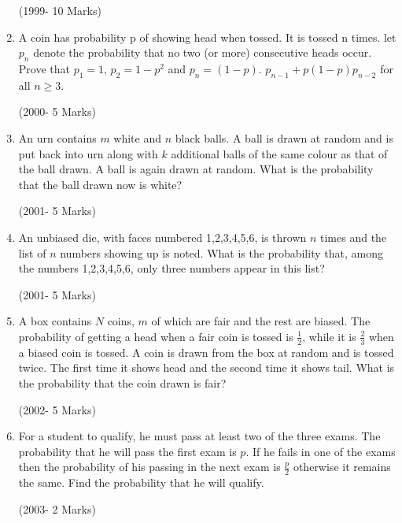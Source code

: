 \documentclass[journal,12pt,onecolumn]{IEEEtran}
\theoremstyle{remark}
\begin{document}
\begin{enumerate}
\hfill(1999- 10 Marks)

\item A coin has probability p of showing head when tossed. It is tossed n times. let $p_{n}$ denote the probability that no two (or more) consecutive heads occur. Prove that $p_{1}=1$, $p_{2}=1-p^2$ and $p_{n}=(1-p)$. $p_{n-1}+p(1-p)p_{n-2}$ for all $n \geq 3$. 

\hfill(2000- 5 Marks)

\item An urn contains $m$ white and $n$ black balls. A ball is drawn at random and is put back into urn along with $k$ additional balls of the same colour as that of the ball drawn. A ball is again drawn at random. What is the probability that the ball drawn now is white?

\hfill(2001- 5 Marks)

\item An unbiased die, with faces numbered 1,2,3,4,5,6, is thrown $n$ times and the list of $n$ numbers showing up is noted. What is the probability that, among the numbers 1,2,3,4,5,6, only three numbers appear in this list?

\hfill(2001- 5 Marks)

\item A box contains $N$ coins, $m$ of which are fair and the rest are biased. The probability of getting a head when a fair coin is tossed is $\frac{1}{2}$, while it is $\frac{2}{3}$ when a biased coin is tossed. A coin is drawn from the box at random and is tossed twice. The first time it shows head and the second time it shows tail. What is the probability that the coin drawn is fair?

\hfill(2002- 5 Marks)

\item For a student to qualify, he must pass at least two of the three exams. The probability that he will pass the first exam is $p$. If he fails in one of the exams then the probability of his passing in the next exam is $\frac{p}{2}$ otherwise it remains the same. Find the probability that he will qualify.

\hfill(2003- 2 Marks)
\end{enumerate}
\end{document}
